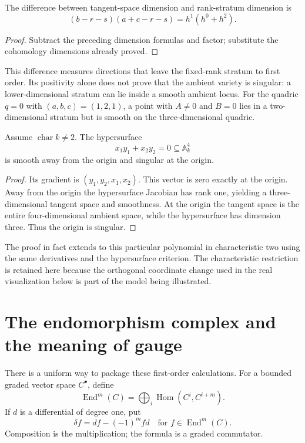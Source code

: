 \begin{corollary}
The difference between tangent-space dimension and rank-stratum dimension is
\[
(b-r-s)(a+c-r-s)=h^1(h^0+h^2).
\]
\end{corollary}
\begin{proof}
Subtract the preceding dimension formulas and factor; substitute the cohomology dimensions already proved.
\end{proof}

This difference measures directions that leave the fixed-rank stratum to first order. Its positivity alone does not prove that the ambient variety is singular: a lower-dimensional stratum can lie inside a smooth ambient locus. For the quadric $q=0$ with $(a,b,c)=(1,2,1)$, a point with $A\neq0$ and $B=0$ lies in a two-dimensional stratum but is smooth on the three-dimensional quadric.

\begin{proposition}
Assume $\operatorname{char}k\neq2$. The hypersurface
\[
x_1y_1+x_2y_2=0\subseteq\mathbb A_k^4
\]
is smooth away from the origin and singular at the origin.
\end{proposition}
\begin{proof}
Its gradient is $(y_1,y_2,x_1,x_2)$. This vector is zero exactly at the origin. Away from the origin the hypersurface Jacobian has rank one, yielding a three-dimensional tangent space and smoothness. At the origin the tangent space is the entire four-dimensional ambient space, while the hypersurface has dimension three. Thus the origin is singular.
\end{proof}

The proof in fact extends to this particular polynomial in characteristic two using the same derivatives and the hypersurface criterion. The characteristic restriction is retained here because the orthogonal coordinate change used in the real visualization below is part of the model being illustrated.

\section{The endomorphism complex and the meaning of gauge}

There is a uniform way to package these first-order calculations. For a bounded graded vector space $C^\bullet$, define
\[
\operatorname{End}^m(C)
=\bigoplus_i\operatorname{Hom}(C^i,C^{i+m}).
\]
If $d$ is a differential of degree one, put
\[
\delta f=df-(-1)^mfd
\quad\text{for }f\in\operatorname{End}^m(C).
\]
Composition is the multiplication; the formula is a graded commutator.

